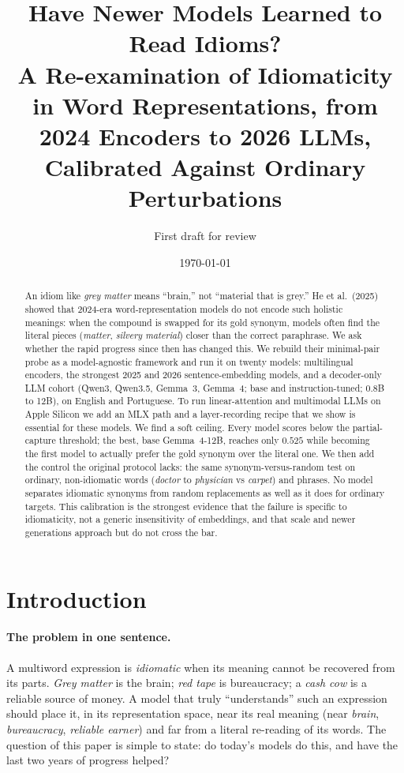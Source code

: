 \documentclass[11pt]{article}
\title{Have Newer Models Learned to Read Idioms?\\[2pt]
\large A Re-examination of Idiomaticity in Word Representations,
from 2024 Encoders to 2026 LLMs, Calibrated Against Ordinary Perturbations}
\author{First draft for review}
\date{\today}
\begin{document}
\maketitle
\thispagestyle{empty}

\begin{abstract}
An idiom like \emph{grey matter} means ``brain,'' not ``material that is grey.'' He et
al.~(2025) showed that 2024-era word-representation models do not encode such holistic meanings:
when the compound is swapped for its gold synonym, models often find the literal pieces
(\emph{matter}, \emph{silvery material}) closer than the correct paraphrase. We ask whether the
rapid progress since then has changed this. We rebuild their minimal-pair probe as a model-agnostic
framework and run it on twenty models: multilingual encoders, the strongest 2025 and 2026
sentence-embedding models, and a decoder-only LLM cohort (Qwen3, Qwen3.5, Gemma~3, Gemma~4; base and
instruction-tuned; 0.8B to 12B), on English and Portuguese. To run linear-attention and multimodal
LLMs on Apple Silicon we add an MLX path and a layer-recording recipe that we show is essential for
these models. We find a soft ceiling. Every model scores below the partial-capture threshold; the
best, base Gemma~4-12B, reaches only $0.525$ while becoming the first model to actually prefer the
gold synonym over the literal one. We then add the control the original protocol lacks: the same
synonym-versus-random test on ordinary, non-idiomatic words (\emph{doctor} to \emph{physician} vs
\emph{carpet}) and phrases. No model separates idiomatic synonyms from random replacements as well
as it does for ordinary targets. This calibration is the strongest evidence that the failure is
specific to idiomaticity, not a generic insensitivity of embeddings, and that scale and newer
generations approach but do not cross the bar.
\end{abstract}

\section{Introduction}

\paragraph{The problem in one sentence.} A multiword expression is \emph{idiomatic} when its
meaning cannot be recovered from its parts. \emph{Grey matter} is the brain; \emph{red tape} is
bureaucracy; a \emph{cash cow} is a reliable source of money. A model that truly ``understands''
such an expression should place it, in its representation space, near its real meaning (near
\emph{brain}, \emph{bureaucracy}, \emph{reliable earner}) and far from a literal re-reading of its
words. The question of this paper is simple to state: do today's models do this, and have the last
two years of progress helped?
\end{document}
